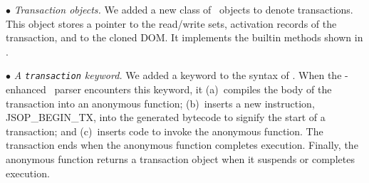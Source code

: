 
\noindent$\bullet$
\textit{Transaction objects.} We added a new class of \js\ objects to
denote transactions. This object stores a pointer to the read/write sets,
activation records of the transaction, and to the cloned DOM. It implements the
builtin methods shown in .


\noindent$\bullet$
\textit{A \texttt{transaction} keyword.} We added a 
keyword to the syntax of \js. When the \txjs-enhanced \js\ parser encounters
this keyword, it (a)~compiles the body of the transaction into an anonymous
function; (b)~inserts a new instruction, \textsf{JSOP\_BEGIN\_TX}, into the
generated bytecode to signify the start of a transaction; and (c)~inserts code
to invoke the anonymous function.  The transaction ends when the anonymous
function completes execution. Finally, the anonymous function returns a
transaction object when it suspends or completes execution.

